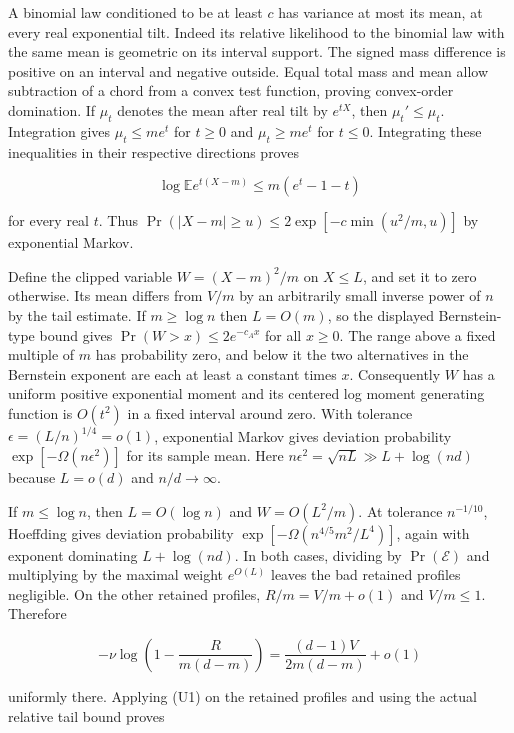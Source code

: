 A binomial law conditioned to be at least $c$ has variance at most its mean, at every real exponential tilt. Indeed its relative likelihood to the binomial law with the same mean is geometric on its interval support. The signed mass difference is positive on an interval and negative outside. Equal total mass and mean allow subtraction of a chord from a convex test function, proving convex-order domination. If $\mu_t$ denotes the mean after real tilt by $e^{tX}$, then $\mu_t'\le\mu_t$. Integration gives $\mu_t\le m e^t$ for $t\ge0$ and $\mu_t\ge m e^t$ for $t\le0$. Integrating these inequalities in their respective directions proves

\begin{equation*}
\log\mathbb E e^{t(X-m)}\le m(e^t-1-t)
\end{equation*}

for every real $t$. Thus $\Pr(|X-m|\ge u)\le2\exp[-c\min(u^2/m,u)]$ by exponential Markov.

Define the clipped variable $W=(X-m)^2/m$ on $X\le L$, and set it to zero otherwise. Its mean differs from $V/m$ by an arbitrarily small inverse power of $n$ by the tail estimate. If $m\ge\log n$ then $L=O(m)$, so the displayed Bernstein-type bound gives $\Pr(W>x)\le2e^{-c_A x}$ for all $x\ge0$. The range above a fixed multiple of $m$ has probability zero, and below it the two alternatives in the Bernstein exponent are each at least a constant times $x$. Consequently $W$ has a uniform positive exponential moment and its centered log moment generating function is $O(t^2)$ in a fixed interval around zero. With tolerance $\epsilon=(L/n)^{1/4}=o(1)$, exponential Markov gives deviation probability $\exp[-\Omega(n\epsilon^2)]$ for its sample mean. Here $n\epsilon^2=\sqrt{nL}\gg L+\log(nd)$ because $L=o(d)$ and $n/d\to\infty$.

If $m\le\log n$, then $L=O(\log n)$ and $W=O(L^2/m)$. At tolerance $n^{-1/10}$, Hoeffding gives deviation probability $\exp[-\Omega(n^{4/5}m^2/L^4)]$, again with exponent dominating $L+\log(nd)$. In both cases, dividing by $\Pr(\mathcal E)$ and multiplying by the maximal weight $e^{O(L)}$ leaves the bad retained profiles negligible. On the other retained profiles, $R/m=V/m+o(1)$ and $V/m\le1$. Therefore

\begin{equation*}
-\nu\log\left(1-\frac{R}{m(d-m)}\right)
=\frac{(d-1)V}{2m(d-m)}+o(1)
\end{equation*}

uniformly there. Applying (U1) on the retained profiles and using the actual relative tail bound proves

